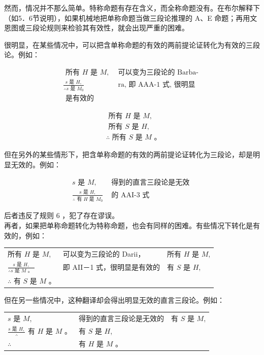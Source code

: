 然而，情况并不那么简单。特称命题有存在含义，而全称命题没有。在布尔解释下（如5．6节说明），如果机械地把单称命题当做三段论推理的 A、E 命题；再用文恩图或三段论规则来检验其有效性，就会出现严重的困难。

很明显，在某些情况中，可以把含单称命题的有效的两前提论证转化为有效的三段论。例如：

$$
\begin{array}{ll}
\text { 所有 } H \text { 是 } M, & \text { 可以变为三段论的 Barba- } \\
\frac{s \text { 是 } H,}{\therefore s \text { 是 } M_{0}} & \text { ra, 即 AAA-1 式, 很明显 } \\
\text { 是有效的 } &
\end{array}
$$

$$
\begin{aligned}
& \text { 所有 } H \text { 是 } M, \\
& \text { 所有 } S \text { 是 } H, \\
& \therefore \text { 所有 } S \text { 是 } M \text { 。 }
\end{aligned}
$$

但在另外的某些情形下，把含单称命题的有效的两前提论证转化为三段论，却是明显无效的。例如：

$$
\begin{array}{ll}
s \text { 是 } M, & \text { 得到的直言三段论是无效 } \\
\frac{s \text { 是 } H,}{\therefore \text { 有 } H \text { 是 } M_{0}} & \text { 的 AAI-3 式 }
\end{array}
$$

后者违反了规则 6 ，犯了存在谬误。\\
再者，如果把单称命题转化为特称命题，也会有同样的困难。有些情况下转化是有效的，例如：

\begin{center}
\begin{tabular}{lll}
所有 $H$ 是 $M$, & 可以变为三段论的 Darii， & 所有 $H$ 是 $M$, \\
$\frac{s \text { 是 } H,}{\therefore s \text { 是 } M \text { 。 }}$ & 即 AII－1 式，很明显是有效的 & 有 $S$ 是 $H$, \\
$\therefore$ 有 $S$ 是 $M$ 。 &  &  \\
\end{tabular}
\end{center}

但在另一些情况中，这种翻译却会得出明显无效的直言三段论。例如：

\begin{center}
\begin{tabular}{lll}
$s$ 是 $M$, & 得到的直言三段论是无效的 & 有 $S$ 是 $M$, \\
$\frac{s \text { 是 } H,}{\therefore}$ 有 $H$ 是 $M$ 。 & 有 $S$ 是 $H$, &  \\
$\therefore$ & 有 $H$ 是 $M$ 。 &  \\
\end{tabular}
\end{center}

